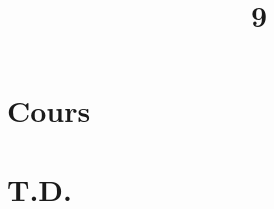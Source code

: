\documentclass[a4paper]{article}
\title{9}{Produits scalaires}
\begin{document}
	\part{Cours}
	
	
	
	
	
	\clearpage\null\clearpage
	\renewcommand{\thesection}{}
	\renewcommand{\thesubsection}{}
	\part{T.D.}
	
	
\end{document}
